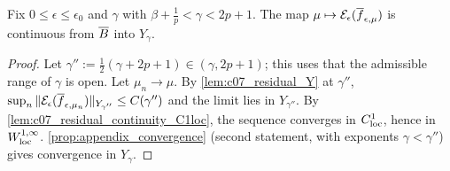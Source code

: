 \begin{lemma}
  \label{lem:c07_residual_continuity_Y}
  Fix $0\le\epsilon\le\epsilon_0$ and $\gamma$ with $\beta+\frac1p<\gamma<2p+1$. The map
  $\mu\mapsto\mathcal{E}_\epsilon(\overline{f}_{\epsilon,\mu})$ is continuous from $\overline{B}$ into $Y_\gamma$.
\end{lemma}
\begin{proof}
  Let $\gamma'':=\frac12(\gamma+2p+1)\in(\gamma,2p+1)$; this uses that the admissible range of $\gamma$ is open.
  Let $\mu_n\to\mu$. By \cref{lem:c07_residual_Y} at $\gamma''$, $\sup_n\|\mathcal{E}_\epsilon(\overline{f}_{\epsilon,\mu_n})\|_{Y_{\gamma''}}\le C(\gamma'')$
  and the limit lies in $Y_{\gamma''}$. By \cref{lem:c07_residual_continuity_C1loc}, the sequence converges in
  $C^1_{\textup{loc}}$, hence in $W^{1,\infty}_{\textup{loc}}$. \cref{prop:appendix_convergence} (second statement, with
  exponents $\gamma<\gamma''$) gives convergence in $Y_\gamma$.
\end{proof}

